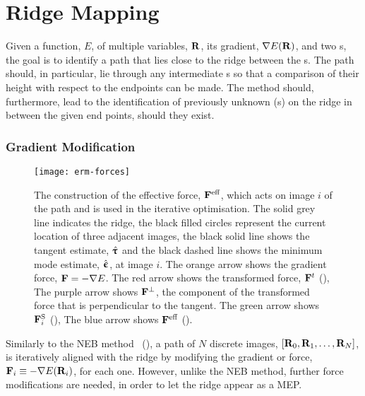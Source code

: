 \section{Ridge Mapping}
\label{sec:ridge-mapping}

Given a function, $E$, of multiple variables, ${\mathrm{\mathbf{\bm{R}}}}$, its gradient, $\nabla E({\mathrm{\mathbf{\bm{R}}}})$, and two s, the goal is to identify a path that lies close to the ridge between the s.
The path should, in particular, lie through any intermediate s so that a comparison of their height with respect to the endpoints can be made.
The method should, furthermore, lead to the identification of previously unknown (s) on the ridge in between the given end points, should they exist.

\subsubsection{Gradient Modification}
\begin{figure}[h]
\begin{center}
\texttt{[image: erm-forces]}
    \parbox{0.85\linewidth}{
\caption{
The construction of the effective force, ${\mathrm{\mathbf{\bm{F}}}}^\text{eff}$,
which acts on image $i$ of the path and is used in the iterative optimisation.
The solid grey line indicates the ridge,
the black filled circles represent the current location of three adjacent images,
the black solid line shows the tangent estimate, $\hat{{\mathrm{\mathbf{\bm{\uptau}}}}}$
and the black dashed line shows the minimum mode estimate, $\hat{{\mathrm{\mathbf{\bm{\upepsilon}}}}}$, at image $i$.
The orange arrow shows the gradient force, ${\mathrm{\mathbf{\bm{F}}}}= -\nabla E$.
The red arrow shows the transformed force, ${\mathrm{\mathbf{\bm{F}}}}^t$ (),
The purple arrow shows ${\mathrm{\mathbf{\bm{F}}}}^\perp$, the component of the transformed force that is perpendicular to the tangent.
The green arrow shows ${\mathrm{\mathbf{\bm{F}}}}_i^\text{S}$ (), %
The blue arrow shows ${\mathrm{\mathbf{\bm{F}}}}^\text{eff}$ ().
}
\label{fig:erm-forces}
}
\end{center}
\end{figure}


Similarly to the NEB method~\cite{neb-original-1998} (), a path of $N$ discrete images, $[{\mathrm{\mathbf{\bm{R}}}}_0, {\mathrm{\mathbf{\bm{R}}}}_1, \ldots, {\mathrm{\mathbf{\bm{R}}}}_N]$, is iteratively aligned with the ridge by modifying the gradient or force, ${\mathrm{\mathbf{\bm{F}}}}_i \equiv -\nabla E({\mathrm{\mathbf{\bm{R}}}}_i)$, for each one.
However, unlike the NEB method, further force modifications are needed, in order to let the ridge appear as a MEP.

